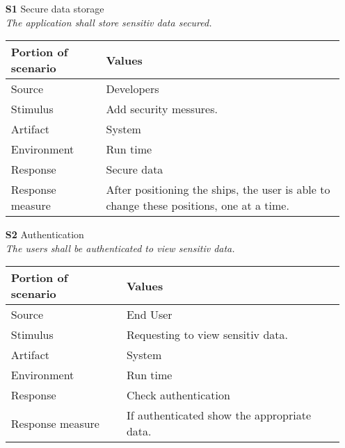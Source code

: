 \begin{itemize}
    \item[\textbf{S1}] Secure data storage \\
    \textit{\small{The application shall store sensitiv data secured.}}
        
    \begin{tabular}{| l | p{7cm} |}
        \hline
        \rowcolor[gray]{0.8}
        \textbf{Portion of scenario} & \textbf{Values} \\
        \hline
        Source & Developers \\
        Stimulus & Add security messures. \\
        Artifact & System \\
        Environment & Run time \\
        Response & Secure data  \\
        Response measure & After positioning the ships, the user is able to change these positions, one at a time. \\
        \hline
    \end{tabular}

    \item[\textbf{S2}] Authentication \\
    \textit{\small{The users shall be authenticated to view sensitiv data.}}
        
    \begin{tabular}{| l | p{7cm} |}
        \hline
        \rowcolor[gray]{0.8}
        \textbf{Portion of scenario} & \textbf{Values} \\
        \hline
        Source & End User \\
        Stimulus & Requesting to view sensitiv data. \\
        Artifact & System \\
        Environment & Run time \\
        Response & Check authentication \\
        Response measure & If authenticated show the appropriate data. \\
        \hline
    \end{tabular}

\end{itemize}